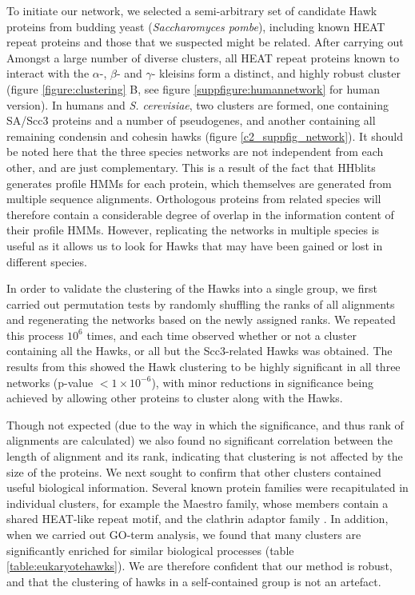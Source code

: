 \documentclass[a4paper,11pt,twoside,openright]{scrbook}
\begin{document}
To initiate our network, we selected a semi-arbitrary set of candidate Hawk proteins from budding yeast (\textit{Saccharomyces pombe}), including known HEAT repeat proteins and those that we suspected might be related. After carrying out Amongst a large number of diverse clusters, all HEAT repeat proteins known to interact with the $\alpha$-, $\beta$- and $\gamma$- kleisins \cite{Nasmyth2009, Hirano2016} form a distinct, and highly robust cluster (figure \ref{figure:clustering} B, see figure \ref{suppfigure:humannetwork} for human version). In humans and \textit{S. cerevisiae}, two clusters are formed, one containing SA/Scc3 proteins and a number of pseudogenes, and another containing all remaining condensin and cohesin hawks (figure \ref{c2_suppfig_network}). It should be noted here that the three species networks are not independent from each other, and are just complementary. This is a result of the fact that HHblits generates profile HMMs for each protein, which themselves are generated from multiple sequence alignments. Orthologous proteins from related species will therefore contain a considerable degree of overlap in the information content of their profile HMMs. However, replicating the networks in multiple species is useful as it allows us to look for Hawks that may have been gained or lost in different species.

In order to validate the clustering of the Hawks into a single group, we first carried out permutation tests by randomly shuffling the ranks of all alignments and regenerating the networks based on the newly assigned ranks. We repeated this process $10^{6}$ times, and each time observed whether or not a cluster containing all the Hawks, or all but the Scc3-related Hawks was obtained. The results from this showed the Hawk clustering to be highly significant in all three networks (p-value $< 1 \times 10^{-6}$), with minor reductions in significance being achieved by allowing other proteins to cluster along with the Hawks.

Though not expected (due to the way in which the significance, and thus rank of alignments are calculated) we also found no significant correlation between the length of alignment and its rank, indicating that clustering is not affected by the size of the proteins. We next sought to confirm that other clusters contained useful biological information. Several known protein families were recapitulated in individual clusters, for example the Maestro family, whose members contain a shared HEAT-like repeat motif, and the clathrin adaptor family \cite{Smith2003a, McMahon2004}. In addition, when we carried out GO-term analysis, we found that many clusters are significantly enriched for similar biological processes (table \ref{table:eukaryotehawks}). We are therefore confident that our method is robust, and that the clustering of hawks in a self-contained group is not an artefact.
\end{document}

